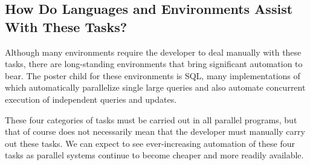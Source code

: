 \subsection{How Do Languages and Environments Assist With These Tasks?}
\label{sec:intro:How Do Languages and Environments Assist With These Tasks?}

Although many environments require the developer to deal manually
with these tasks, there are long-standing environments that bring
significant automation to bear.
The poster child for these environments is SQL, many implementations
of which automatically parallelize single large queries and also
automate concurrent execution of independent queries and updates.

These four categories of tasks must be carried out in all parallel
programs, but that of course does not necessarily mean that the developer
must manually carry out these tasks.
We can expect to see ever-increasing automation of these four tasks
as parallel systems continue to become cheaper and more readily available.

